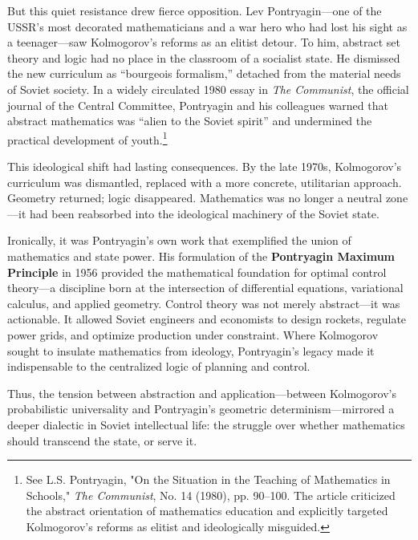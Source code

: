 But this quiet resistance drew fierce opposition. Lev Pontryagin—one of the USSR’s most decorated mathematicians and a war hero who had lost his sight as a teenager—saw Kolmogorov’s reforms as an elitist detour. To him, abstract set theory and logic had no place in the classroom of a socialist state. He dismissed the new curriculum as “bourgeois formalism,” detached from the material needs of Soviet society. In a widely circulated 1980 essay in \textit{The Communist}, the official journal of the Central Committee, Pontryagin and his colleagues warned that abstract mathematics was “alien to the Soviet spirit” and undermined the practical development of youth.\footnote{See L.S. Pontryagin, "On the Situation in the Teaching of Mathematics in Schools," \textit{The Communist}, No. 14 (1980), pp. 90–100. The article criticized the abstract orientation of mathematics education and explicitly targeted Kolmogorov’s reforms as elitist and ideologically misguided.}

This ideological shift had lasting consequences. By the late 1970s, Kolmogorov’s curriculum was dismantled, replaced with a more concrete, utilitarian approach. Geometry returned; logic disappeared. Mathematics was no longer a neutral zone—it had been reabsorbed into the ideological machinery of the Soviet state.

Ironically, it was Pontryagin’s own work that exemplified the union of mathematics and state power. His formulation of the \textbf{Pontryagin Maximum Principle} in 1956 provided the mathematical foundation for optimal control theory—a discipline born at the intersection of differential equations, variational calculus, and applied geometry. Control theory was not merely abstract—it was actionable. It allowed Soviet engineers and economists to design rockets, regulate power grids, and optimize production under constraint. Where Kolmogorov sought to insulate mathematics from ideology, Pontryagin’s legacy made it indispensable to the centralized logic of planning and control.

Thus, the tension between abstraction and application—between Kolmogorov’s probabilistic universality and Pontryagin’s geometric determinism—mirrored a deeper dialectic in Soviet intellectual life: the struggle over whether mathematics should transcend the state, or serve it.

\medskip

